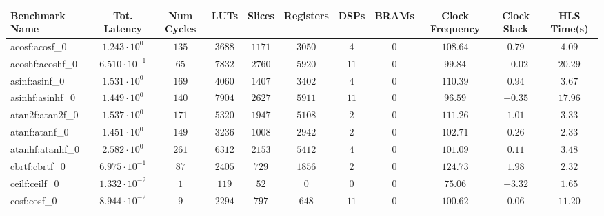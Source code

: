 \begin{tabular}{|l|c|c|c|c|c|c|c|c|c|c|}
\hline
Benchmark Name               & Tot. Latency            & Num Cycles & LUTs       & Slices    & Registers & DSPs    & BRAMs & Clock Frequency & Clock Slack & HLS Time(s) \\
\hline
acosf:acosf\_0               & $ 1.243 \cdot 10^{0}  $ & $ 135    $ & $ 3688   $ & $ 1171  $ & $ 3050  $ & $ 4   $ & $ 0 $ & $ 108.64      $ & $ 0.79    $ & $ 4.09    $ \\
acoshf:acoshf\_0             & $ 6.510 \cdot 10^{-1} $ & $ 65     $ & $ 7832   $ & $ 2760  $ & $ 5920  $ & $ 11  $ & $ 0 $ & $ 99.84       $ & $ -0.02   $ & $ 20.29   $ \\
asinf:asinf\_0               & $ 1.531 \cdot 10^{0}  $ & $ 169    $ & $ 4060   $ & $ 1407  $ & $ 3402  $ & $ 4   $ & $ 0 $ & $ 110.39      $ & $ 0.94    $ & $ 3.67    $ \\
asinhf:asinhf\_0             & $ 1.449 \cdot 10^{0}  $ & $ 140    $ & $ 7904   $ & $ 2627  $ & $ 5911  $ & $ 11  $ & $ 0 $ & $ 96.59       $ & $ -0.35   $ & $ 17.96   $ \\
atan2f:atan2f\_0             & $ 1.537 \cdot 10^{0}  $ & $ 171    $ & $ 5320   $ & $ 1947  $ & $ 5108  $ & $ 2   $ & $ 0 $ & $ 111.26      $ & $ 1.01    $ & $ 3.33    $ \\
atanf:atanf\_0               & $ 1.451 \cdot 10^{0}  $ & $ 149    $ & $ 3236   $ & $ 1008  $ & $ 2942  $ & $ 2   $ & $ 0 $ & $ 102.71      $ & $ 0.26    $ & $ 2.33    $ \\
atanhf:atanhf\_0             & $ 2.582 \cdot 10^{0}  $ & $ 261    $ & $ 6312   $ & $ 2153  $ & $ 5412  $ & $ 4   $ & $ 0 $ & $ 101.09      $ & $ 0.11    $ & $ 3.48    $ \\
cbrtf:cbrtf\_0               & $ 6.975 \cdot 10^{-1} $ & $ 87     $ & $ 2405   $ & $ 729   $ & $ 1856  $ & $ 2   $ & $ 0 $ & $ 124.73      $ & $ 1.98    $ & $ 2.32    $ \\
ceilf:ceilf\_0               & $ 1.332 \cdot 10^{-2} $ & $ 1      $ & $ 119    $ & $ 52    $ & $ 0     $ & $ 0   $ & $ 0 $ & $ 75.06       $ & $ -3.32   $ & $ 1.65    $ \\
cosf:cosf\_0                 & $ 8.944 \cdot 10^{-2} $ & $ 9      $ & $ 2294   $ & $ 797   $ & $ 648   $ & $ 11  $ & $ 0 $ & $ 100.62      $ & $ 0.06    $ & $ 11.20   $ \\

\end{tabular}
